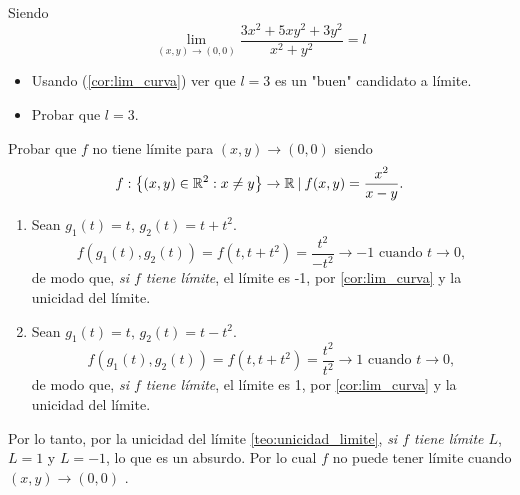 \begin{tarea}Siendo  $$\lim_{(x,y)\rightarrow (0,0)} \dfrac{ 3x^{2} + 5xy^{2}+3y^{2}}{x^{2} + y^{2}} = l$$
\begin{itemize}
\item[1.] Usando  (\ref{cor:lim_curva})  ver que $l=3$  es un "buen" candidato a l\'imite. 
\item[2.] Probar que $l=3.$
\end{itemize}
\end{tarea}



\begin{example} Probar que $f$ no tiene l\'imite para $(x,y) \to (0,0)$ siendo $$ f: \left\lbrace (x,y) \in \mathbb{R}^2 : x \ne y \right\rbrace \to \mathbb{R} \: |\:  f(x,y) = \frac{x^2}{x - y}.$$
   \begin{enumerate} 
   \item  Sean $g_1(t) = t, \,  g_2(t) = t + t^2$.
  \[
   f(g_1(t),g_2(t)) = f(t,t + t^2) = \frac{t^2}{-t^2} \to -1 \text{ cuando } t \to 0,
  \]
  de modo que, \emph{si $f$ tiene l\'imite}, el l\'imite es -1, por \eqref{cor:lim_curva} y la unicidad del l\'imite.
  \item  Sean $g_1(t) = t, \, g_2(t) = t - t^2$.
  \[
   f(g_1(t),g_2(t)) = f(t,t + t^2) = \frac{t^2}{t^2} \to 1 \text{ cuando } t \to 0,
  \]
  de modo que, \emph{si $f$ tiene l\'imite}, el l\'imite es 1, por \eqref{cor:lim_curva} y la unicidad del l\'imite.
  \end{enumerate}
  Por lo tanto, por la unicidad del l\'imite \eqref{teo:unicidad_limite}, \emph{si $f$ tiene l\'imite $L$}, $L = 1$ y $ L= -1$, lo que es un absurdo.  Por lo cual $f$ no puede tener l\'imite cuando  $(x,y) \to (0,0)$  .
\end{example}



